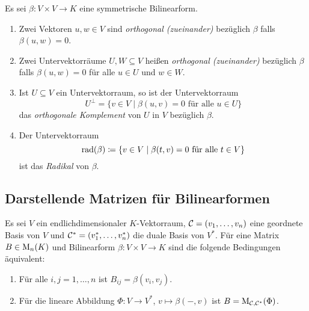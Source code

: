 \begin{definition}
  Es sei $\beta \colon V \times V \to K$ eine symmetrische Bilinearform.
  \begin{enumerate}[leftmargin=*, label=\roman*)]
    \item
      Zwei Vektoren $u, w \in V$ sind \emph{orthogonal (zueinander)} bezüglich $\beta$ falls $\beta(u,w) = 0$.
    \item
      Zwei Untervektorräume $U, W \subseteq V$ heißen \emph{orthogonal (zueinander)} bezüglich $\beta$ falls $\beta(u,w) = 0$ für alle $u \in U$ und $w \in W$.
    \item
      Ist $U \subseteq V$ ein Untervektorraum, so ist der Untervektorraum
      \[
        U^\perp
        =
        \{
          v \in V
          \mid
          \text{$\beta(u,v) = 0$ für alle $u \in U$}
        \}
      \]
      das \emph{orthogonale Komplement} von $U$ in $V$ bezüglich $\beta$.
    \item
      Der Untervektorraum
      \[
        \operatorname{rad}(\beta)
        \coloneqq
        \{v \in V \mid \text{$\beta(t,v) = 0$ für alle $t \in V$}\}
      \]
      ist das \emph{Radikal} von $\beta$.
  \end{enumerate}
\end{definition}












\subsection{Darstellende Matrizen für Bilinearformen}


\begin{lemma}\label{lem: possible definitions of the representing matrix of a bilinear form}
  Es sei $V$ ein endlichdimensionaler $K$-Vektorraum, $\mathcal{C} = (v_1, \dotsc, v_n)$ eine geordnete Basis von $V$ und $\mathcal{C}^* = (v_1^*, \dotsc, v_n^*)$ die duale Basis von $V^*$.
  Für eine Matrix $B \in \mathrm{M}_n(K)$ und Bilinearform $\beta \colon V \times V \to K$ sind die folgende Bedingungen äquivalent:
  \begin{enumerate}[leftmargin=*, label=\roman*)]
    \item
      Für alle $i,j = 1, \dotsc, n$ ist $B_{ij} = \beta(v_i, v_j)$.
    \item
      Für die lineare Abbildung $\Phi \colon V \to V^*$, $v \mapsto \beta(-,v)$ ist $B = \mathrm{M}_{\mathcal{C}, \mathcal{C}^*}(\Phi)$.
  \end{enumerate}
\end{lemma}


